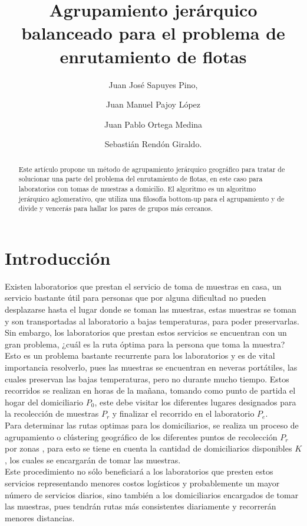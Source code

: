 \documentclass[runningheads]{llncs}
\begin{document}
%
\title{Agrupamiento jerárquico balanceado para el problema de enrutamiento de flotas}
%
%
\author{Juan José Sapuyes Pino, \and
    Juan Manuel Pajoy López \and
    Juan Pablo Ortega Medina \and
    Sebastián Rendón Giraldo.}
%
\authorrunning{}
%
%
\maketitle%
%
\begin{abstract}
    Este artículo propone un método de agrupamiento jerárquico geográfico para tratar de
    solucionar una parte del problema del enrutamiento de flotas, en este caso para
    laboratorios con tomas de muestras a domicilio. El algoritmo es un algoritmo
    jerárquico aglomerativo, que utiliza una filosofía bottom-up para el agrupamiento
    y de divide y vencerás para hallar los pares de grupos más cercanos.
\end{abstract}

\section{Introducción}
Existen laboratorios que prestan el servicio de toma de muestras en casa,
un servicio bastante útil para personas que por alguna dificultad no pueden desplazarse
hasta el lugar donde se toman las muestras, estas muestras se toman y son transportadas
al laboratorio a bajas temperaturas, para poder preservarlas. Sin embargo, los laboratorios
que prestan estos servicios se encuentran con un gran problema, ¿cuál es la ruta óptima para
la persona que toma la muestra? Esto es un problema bastante recurrente para los laboratorios
y es de vital importancia resolverlo, pues las muestras se encuentran en neveras portátiles,
las cuales preservan las bajas temperaturas, pero no durante mucho tiempo.  Estos recorridos se
realizan en horas de la mañana, tomando como punto de partida el hogar del domiciliario $P_{0}$,
este debe visitar los diferentes lugares designados para la recolección de muestras $P_{r}$ y
finalizar el recorrido en el laboratorio $P_{e}$.
\\
Para determinar las rutas optimas para los domiciliarios, se realiza un proceso de agrupamiento
o clústering geográfico de los diferentes puntos de recolección $P_{r}$ por zonas \cite{bard11},
para esto se tiene en cuenta la cantidad de domiciliarios disponibles $K$, los cuales se encargarán
de tomar las muestras.
\\
Este procedimiento no sólo beneficiará a los laboratorios que presten estos servicios representando
menores costos logísticos y probablemente un mayor número de servicios diarios, sino también a los
domiciliarios encargados de tomar las muestras, pues tendrán rutas más consistentes diariamente y
recorrerán menores distancias.
\end{document}
